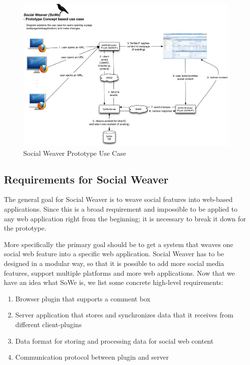\begin{figure}\centering
		\includegraphics[width=13cm]{images/sowe-prototype-use-case.png}
		\caption{Social Weaver Prototype Use Case}
		\label{sowe-prototype-use-case}
\end{figure} 

\subsection{Requirements for Social Weaver}\label{sowe-reqs}

The general goal for Social Weaver is to weave social features into web-based applications. Since this is a broad requirement and impossible to be applied to any web application right from the beginning; it is necessary to break it down for the prototype.

More specifically the primary goal should be to get a system that weaves one social web feature into a specific web application. Social Weaver has to be designed in a modular way, so that it is possible to add more social media features, support multiple platforms and more web applications. Now that we have an idea what SoWe is, we list some concrete high-level requirements:

\begin{enumerate}
\item Browser plugin that supports a comment box
\item Server application that stores and synchronizes data that it receives from different client-plugins
\item Data format for storing and processing data for social web content
\item Communication protocol between plugin and server
\end{enumerate}

